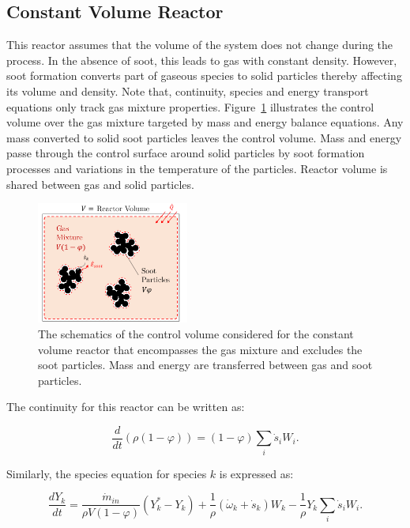 \subsection{Constant Volume Reactor}
This reactor assumes that the volume of the system does not change during the process. In the absence of soot, this leads to gas with constant density. However, soot formation converts part of gaseous species to solid particles thereby affecting its volume and density. Note that, continuity, species and energy transport equations only track gas mixture properties. Figure~\ref{fig:constuvcv} illustrates the control volume over the gas mixture targeted by mass and energy balance equations. Any mass converted to solid soot particles leaves the control volume. Mass and energy passe through the control surface around solid particles by soot formation processes and variations in the temperature of the particles. Reactor volume is shared between gas and solid particles.
\begin{figure}[!htbp]
	\centering
	\includegraphics[height=40mm, ]{Figures/Theory/ConstUV.pdf}
	\caption{The schematics of the control volume considered for the constant volume reactor that encompasses the gas mixture and excludes the soot particles. Mass and energy are transferred between gas and soot particles.}
	\label{fig:constuvcv}
\end{figure}
 
The continuity for this reactor can be written as:

\begin{equation}
	\frac{d}{dt}(\rho(1-\varphi)) =(1-\varphi) \sum_i \dot s_i W_i
	\label{eqn:contconstuv}.
\end{equation} 

Similarly, the species equation for species $k$ is expressed as:

\begin{equation}
	\frac{dY_k}{dt}
	=
	\frac{{\dot{m}}_{in}}{\rho V\left(1-\varphi\right)}
	\left( Y_k^\ast-Y_k \right)
	+
	\frac{1}{\rho}
	\left(
		{\dot{\omega}}_k
		+
		{\dot{s}}_k
	\right)W_k
	-\frac{1}{\rho}Y_k\sum_{i}{{\dot{s}}_i W_i}
	\label{eqn:speciesconstuv}.
\end{equation}

